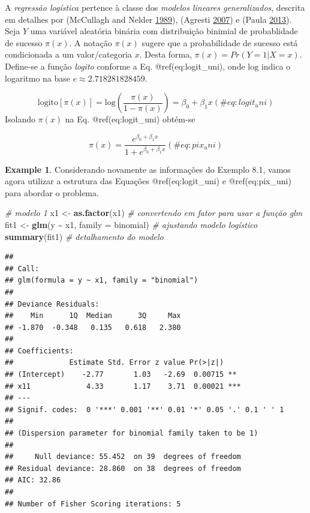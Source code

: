 \documentclass[
]{book}
\newenvironment{Shaded}{\begin{snugshade}}{\end{snugshade}}
\newcommand{\CommentTok}[1]{\textcolor[rgb]{0.56,0.35,0.01}{\textit{#1}}}
\newcommand{\DataTypeTok}[1]{\textcolor[rgb]{0.13,0.29,0.53}{#1}}
\newcommand{\KeywordTok}[1]{\textcolor[rgb]{0.13,0.29,0.53}{\textbf{#1}}}
\newcommand{\NormalTok}[1]{#1}
\newcommand{\OperatorTok}[1]{\textcolor[rgb]{0.81,0.36,0.00}{\textbf{#1}}}
\newcommand{\StringTok}[1]{\textcolor[rgb]{0.31,0.60,0.02}{#1}}
\theoremstyle{definition}
\theoremstyle{definition}
\newtheorem{example}{Example}[chapter]
\theoremstyle{definition}
\theoremstyle{remark}
\begin{document}
A \emph{regressão logística} pertence à classe dos \emph{modelos lineares generalizados}, descrita em detalhes por (McCullagh and Nelder \protect\hyperlink{ref-mccullagh1989generalized}{1989}), (Agresti \protect\hyperlink{ref-agresti2007introduction}{2007}) e (Paula \protect\hyperlink{ref-paula2013modelos}{2013}). Seja \(Y\) uma variável aleatória binária com distribuição binimial de probablidade de sucesso \(\pi(x)\). A notação \(\pi(x)\) sugere que a probabilidade de sucesso está condicionada a um valor/categoria \(x\). Desta forma, \(\pi(x) = Pr(Y=1|X=x)\). Define-se a função \emph{logito} conforme a Eq. @ref(eq:logit\_uni), onde \(\mathrm{log}\) indica o logaritmo na base \(e \approx 2.718281828459\).

\begin{equation}
\mathrm{logito}\left[ \pi(x) \right] = \mathrm{log} \left( \dfrac{\pi(x)}{1-\pi(x)} \right) = \beta_0 + \beta_1 x
(\#eq:logit_uni)
\end{equation}
Isolando \(\pi(x)\) na Eq. @ref(eq:logit\_uni) obtém-se

\begin{equation}
\pi(x) = \dfrac{e^{\beta_0 + \beta_1 x}}{1+e^{\beta_0 + \beta_1 x}}
(\#eq:pix_uni)
\end{equation}

\begin{example}
\protect\hypertarget{exm:unnamed-chunk-136}{}{\label{exm:unnamed-chunk-136} }Considerando novamente as informações do Exemplo 8.1, vamos agora utilizar a estrutura das Equações @ref(eq:logit\_uni) e @ref(eq:pix\_uni) para abordar o problema.
\end{example}

\begin{Shaded}
\begin{Highlighting}[]
\CommentTok{\# modelo 1}
\NormalTok{x1 \textless{}{-}}\StringTok{ }\KeywordTok{as.factor}\NormalTok{(x1)  }\CommentTok{\# convertendo em fator para usar a função glm}
\NormalTok{fit1 \textless{}{-}}\StringTok{ }\KeywordTok{glm}\NormalTok{(y }\OperatorTok{\textasciitilde{}}\StringTok{ }\NormalTok{x1, }\DataTypeTok{family =} \StringTok{\textquotesingle{}binomial\textquotesingle{}}\NormalTok{) }\CommentTok{\# ajustando modelo logístico}
\KeywordTok{summary}\NormalTok{(fit1) }\CommentTok{\# detalhamento do modelo}
\end{Highlighting}
\end{Shaded}

\begin{verbatim}
## 
## Call:
## glm(formula = y ~ x1, family = "binomial")
## 
## Deviance Residuals: 
##    Min      1Q  Median      3Q     Max  
## -1.870  -0.348   0.135   0.618   2.380  
## 
## Coefficients:
##             Estimate Std. Error z value Pr(>|z|)    
## (Intercept)    -2.77       1.03   -2.69  0.00715 ** 
## x11             4.33       1.17    3.71  0.00021 ***
## ---
## Signif. codes:  0 '***' 0.001 '**' 0.01 '*' 0.05 '.' 0.1 ' ' 1
## 
## (Dispersion parameter for binomial family taken to be 1)
## 
##     Null deviance: 55.452  on 39  degrees of freedom
## Residual deviance: 28.860  on 38  degrees of freedom
## AIC: 32.86
## 
## Number of Fisher Scoring iterations: 5
\end{verbatim}
\end{document}
